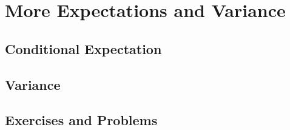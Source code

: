 \section{More Expectations and Variance}

\subsection{Conditional Expectation}

\subsection{Variance}

\subsection{Exercises and Problems}